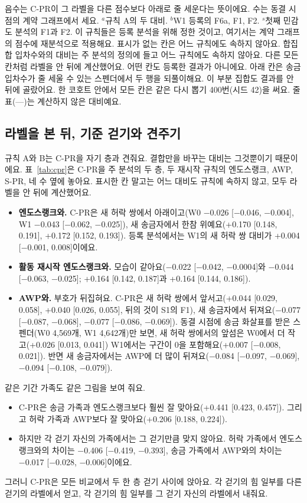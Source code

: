 \begin{table}[!ht]
\vspace{4pt}
\parbox{\linewidth}{\footnotesize 음수는 C-PR이 그 라벨을 다른 점수보다 아래로 줄 세운다는 뜻이에요. 수는 동결 시점의 계약 그래프에서 세요. $^{a}$규칙 A의 두 대비. $^{b}$W1 등록의 F6a, F1, F2. $^{s}$첫째 민감도 분석의 F1과 F2. 이 규칙들은 등록 분석을 위해 정한 것이고, 여기서는 계약 그래프의 점수에 재분석으로 적용해요. 표시가 없는 칸은 어느 규칙에도 속하지 않아요. 합집합 입차수와의 대비는 주 분석의 정의에 들고 어느 규칙에도 속하지 않아요. 다른 모든 칸처럼 라벨을 안 뒤에 계산했어요. 어떤 칸도 등록한 결과가 아니에요. 아래 칸은 송금 입차수가 줄 세울 수 있는 스펜더에서 두 행을 되풀이해요. 이 부분 집합도 결과를 안 뒤에 골랐어요. 한 코호트 안에서 모든 칸은 같은 다시 뽑기 400번(시드 42)을 써요. 줄표(---)는 계산하지 않은 대비예요.}
\end{table}

\subsection{라벨을 본 뒤, 기준 걷기와 견주기}
\label{sec:reference}

규칙 A와 B는 C-PR을 자기 층과 견줘요. 결합만을 바꾸는 대비는 그것뿐이기 때문이에요. 표~\ref{tab:cpr}은 C-PR을 주 분석의 두 층, 두 재시작 규칙의 엔도스랭크, AWP, S-PR, 네 수 옆에 놓아요. 표시한 칸 말고는 어느 대비도 규칙에 속하지 않고, 모두 라벨을 안 뒤에 계산했어요.
\begin{itemize}
\item \textbf{엔도스랭크와.} C-PR은 새 허락 쌍에서 아래이고(W0 −0.026 [−0.046, −0.004], W1 −0.043 [−0.062, −0.025]), 새 송금자에서 한참 위예요(+0.170 [0.148, 0.191], +0.172 [0.152, 0.193]). 등록 분석에서는 W1의 새 허락 쌍 대비가 +0.004 [−0.001, 0.008]이에요.
\item \textbf{활동 재시작 엔도스랭크와.} 모습이 같아요(−0.022 [−0.042, −0.0004]와 −0.044 [−0.063, −0.025]; +0.164 [0.142, 0.187]과 +0.164 [0.144, 0.186]).
\item \textbf{AWP와.} 부호가 뒤집혀요. C-PR은 새 허락 쌍에서 앞서고(+0.044 [0.029, 0.058], +0.040 [0.026, 0.055], 뒤의 것이 S1의 F1), 새 송금자에서 뒤져요(−0.077 [−0.087, −0.068], −0.077 [−0.086, −0.069]). 동결 시점에 송금 화살표를 받은 스펜더(W0 4,569개, W1 4,642개)만 보면, 새 허락 쌍에서의 앞섬은 W0에서 더 작고(+0.026 [0.013, 0.041]) W1에서는 구간이 0을 포함해요(+0.007 [−0.008, 0.021]). 반면 새 송금자에서는 AWP에 더 많이 뒤져요(−0.084 [−0.097, −0.069], −0.094 [−0.108, −0.079]).
\end{itemize}

같은 기간 가족도 같은 그림을 보여 줘요.
\begin{itemize}
\item C-PR은 송금 가족과 엔도스랭크보다 훨씬 잘 맞아요(+0.441 [0.423, 0.457]). 그리고 허락 가족과 AWP보다 잘 맞아요(+0.206 [0.188, 0.224]).
\item 하지만 각 걷기 자신의 가족에서는 그 걷기만큼 맞지 않아요. 허락 가족에서 엔도스랭크와의 차이는 −0.406 [−0.419, −0.393], 송금 가족에서 AWP와의 차이는 −0.017 [−0.028, −0.006]이에요.
\end{itemize}
그러니 C-PR은 모든 비교에서 두 한 층 걷기 사이에 앉아요. 각 걷기의 힘 일부를 다른 걷기의 라벨에서 얻고, 각 걷기의 힘 일부를 그 걷기 자신의 라벨에서 내줘요.
